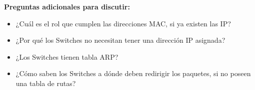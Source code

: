\documentclass[a4paper,10pt]{article}
\begin{document}
\bigskip

\textbf{Preguntas adicionales para discutir:}

\begin{itemize}
    \item ¿Cuál es el rol que cumplen las direcciones MAC, si ya existen las IP?
    \item ¿Por qué los Switches no necesitan tener una dirección IP asignada?
    \item ¿Los Switches tienen tabla ARP?
    \item ¿Cómo saben los Switches a dónde deben redirigir los paquetes, si no poseen una tabla de rutas?
\end{itemize}
\end{document}
